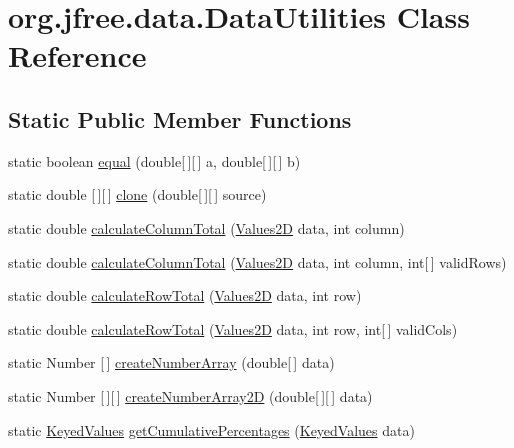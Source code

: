 \hypertarget{classorg_1_1jfree_1_1data_1_1_data_utilities}{}\section{org.\+jfree.\+data.\+Data\+Utilities Class Reference}
\label{classorg_1_1jfree_1_1data_1_1_data_utilities}
\subsection*{Static Public Member Functions}
\begin{DoxyCompactItemize}
\item 
static boolean \mbox{\hyperlink{classorg_1_1jfree_1_1data_1_1_data_utilities_a56e4378a433e7f746a59e97007305d8b}{equal}} (double\mbox{[}$\,$\mbox{]}\mbox{[}$\,$\mbox{]} a, double\mbox{[}$\,$\mbox{]}\mbox{[}$\,$\mbox{]} b)
\item 
static double \mbox{[}$\,$\mbox{]}\mbox{[}$\,$\mbox{]} \mbox{\hyperlink{classorg_1_1jfree_1_1data_1_1_data_utilities_a46835f69caef7c0b31bec6729aac009b}{clone}} (double\mbox{[}$\,$\mbox{]}\mbox{[}$\,$\mbox{]} source)
\item 
static double \mbox{\hyperlink{classorg_1_1jfree_1_1data_1_1_data_utilities_a97fe30b8218c26a0ca6e2139c881bcf1}{calculate\+Column\+Total}} (\mbox{\hyperlink{interfaceorg_1_1jfree_1_1data_1_1_values2_d}{Values2D}} data, int column)
\item 
static double \mbox{\hyperlink{classorg_1_1jfree_1_1data_1_1_data_utilities_aaae596932aff7c2a85ab7069e3945534}{calculate\+Column\+Total}} (\mbox{\hyperlink{interfaceorg_1_1jfree_1_1data_1_1_values2_d}{Values2D}} data, int column, int\mbox{[}$\,$\mbox{]} valid\+Rows)
\item 
static double \mbox{\hyperlink{classorg_1_1jfree_1_1data_1_1_data_utilities_a2b0c56f312e7a1518d9e46e57e094177}{calculate\+Row\+Total}} (\mbox{\hyperlink{interfaceorg_1_1jfree_1_1data_1_1_values2_d}{Values2D}} data, int row)
\item 
static double \mbox{\hyperlink{classorg_1_1jfree_1_1data_1_1_data_utilities_a7f22ac8cce4aa2fc7c799073d169a77a}{calculate\+Row\+Total}} (\mbox{\hyperlink{interfaceorg_1_1jfree_1_1data_1_1_values2_d}{Values2D}} data, int row, int\mbox{[}$\,$\mbox{]} valid\+Cols)
\item 
static Number \mbox{[}$\,$\mbox{]} \mbox{\hyperlink{classorg_1_1jfree_1_1data_1_1_data_utilities_abb1c117ab91d584100036285907f0381}{create\+Number\+Array}} (double\mbox{[}$\,$\mbox{]} data)
\item 
static Number \mbox{[}$\,$\mbox{]}\mbox{[}$\,$\mbox{]} \mbox{\hyperlink{classorg_1_1jfree_1_1data_1_1_data_utilities_a6c763c2ac731dd2dc9461b7bf31d311b}{create\+Number\+Array2D}} (double\mbox{[}$\,$\mbox{]}\mbox{[}$\,$\mbox{]} data)
\item 
static \mbox{\hyperlink{interfaceorg_1_1jfree_1_1data_1_1_keyed_values}{Keyed\+Values}} \mbox{\hyperlink{classorg_1_1jfree_1_1data_1_1_data_utilities_a3bf86eb46d89fd20980836bf9e5f4704}{get\+Cumulative\+Percentages}} (\mbox{\hyperlink{interfaceorg_1_1jfree_1_1data_1_1_keyed_values}{Keyed\+Values}} data)
\end{DoxyCompactItemize}


